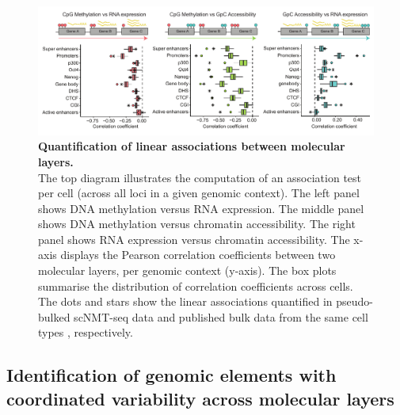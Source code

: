 \begin{figure}[H]
	\centering
	\includegraphics[width=1.0\linewidth]{scNMT_correlations_acrossgenes}
	\caption[]{\textbf{Quantification of linear associations between molecular layers.}\\
	The top diagram illustrates the computation of an association test per cell (across all loci in a given genomic context). The left panel shows DNA methylation versus RNA expression. The middle panel shows DNA methylation versus chromatin accessibility. The right panel shows RNA expression versus chromatin accessibility. The x-axis displays the Pearson correlation coefficients between two molecular layers, per genomic context (y-axis). The box plots summarise the distribution of correlation coefficients across cells. The dots and stars show the linear associations quantified in pseudo-bulked scNMT-seq data and published bulk data from the same cell types \cite{Ficz2013,ENCODE2012}, respectively. }
	\label{fig:scNMT_correlations_acrossgenes}
\end{figure}




\subsection{Identification of genomic elements with coordinated variability across molecular layers}

